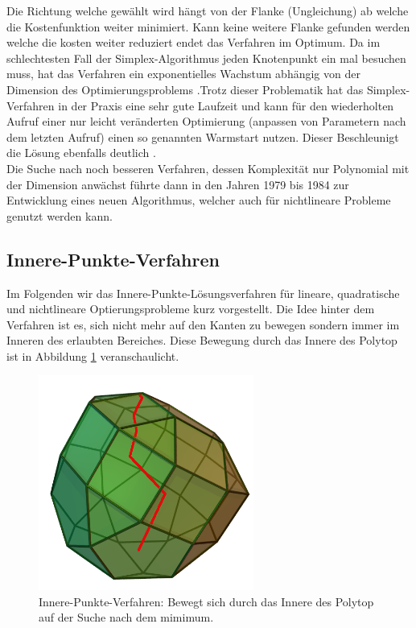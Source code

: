 \documentclass{like}
\begin{document}
Die Richtung welche gewählt wird hängt von der Flanke (Ungleichung) ab welche die Kostenfunktion weiter minimiert. Kann keine weitere Flanke gefunden werden welche die kosten weiter reduziert endet das Verfahren im Optimum. Da im schlechtesten Fall der Simplex-Algorithmus jeden Knotenpunkt ein mal besuchen muss, hat das Verfahren ein exponentielles Wachstum abhängig von der Dimension des Optimierungsproblems \cite{doi:10.1137/S0036144502414942}.Trotz dieser Problematik hat das Simplex-Verfahren in der Praxis eine sehr gute Laufzeit und kann für den wiederholten Aufruf einer nur leicht veränderten Optimierung (anpassen von Parametern nach dem letzten Aufruf) einen so genannten Warmstart nutzen. Dieser Beschleunigt die Lösung ebenfalls deutlich \cite{simplexWiki:1}.\\
Die Suche nach noch besseren Verfahren, dessen Komplexität nur Polynomial mit der Dimension anwächst führte dann in den Jahren 1979 bis 1984 zur Entwicklung eines neuen Algorithmus, welcher auch für nichtlineare Probleme genutzt werden kann.

\subsection{Innere-Punkte-Verfahren} 
\label{ipm} 
Im Folgenden wir das Innere-Punkte-Lösungsverfahren für lineare, quadratische und nichtlineare Optierungsprobleme kurz vorgestellt. Die Idee hinter dem Verfahren ist es, sich nicht mehr auf den Kanten zu bewegen sondern immer im Inneren des erlaubten Bereiches. Diese Bewegung durch das Innere des Polytop ist in Abbildung \ref{fig:iterPointMethod} veranschaulicht.  
\begin{figure}[ht!]
	\centering
	\includegraphics[width=200pt]{Abbildungen/iterPointMethod.png}
	\caption{Innere-Punkte-Verfahren: Bewegt sich durch das Innere des Polytop auf der Suche nach dem mimimum.}
	\label{fig:iterPointMethod}
\end{figure}
\end{document}
